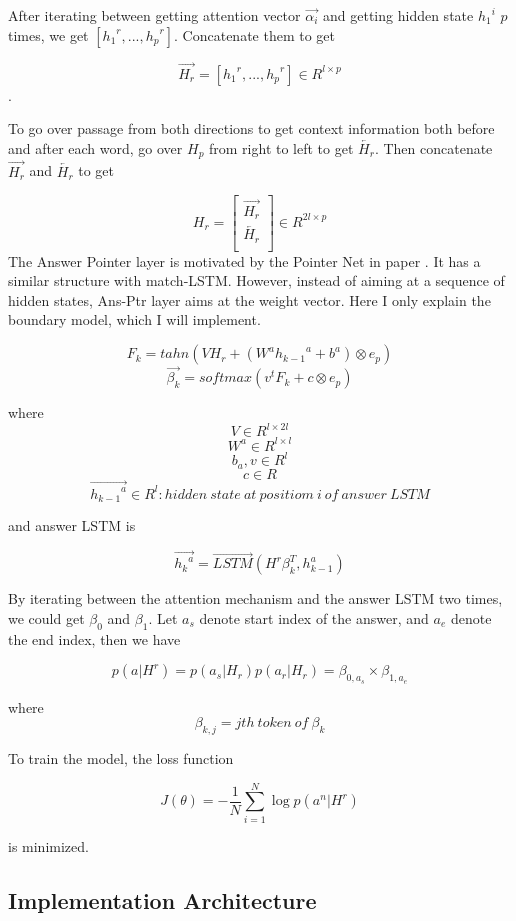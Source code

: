 \documentclass[12pt]{article}
\begin{document}
After iterating between getting attention vector $\overrightarrow{\alpha _i}$ and getting hidden state ${{h_{1}}^i}$ $p$ times, we get $[{{h_{1}}^r}, ..., {{h_{p}}^r}]$. Concatenate them to get

$$\overrightarrow{H_r} = [{{h_{1}}^r}, ..., {{h_{p}}^r}] \in R^{l \times p}$$.

To go over passage from both directions to get context information both before and after each word, go over $H_p$ from right to left to get $\overleftarrow{H_r}$. Then concatenate $\overrightarrow{H_r}$ and $\overleftarrow{H_r}$ to get

\[ H_r =
\begin{bmatrix}
\overrightarrow{H_r} \\
\overleftarrow{H_r} \\
\end{bmatrix}
\in R^{2l \times p}
\]
The Answer Pointer layer is motivated by the Pointer Net in paper \cite{vinyals2015pointer}. It has a similar structure with match-LSTM. However, instead of aiming at a sequence of hidden states, Ans-Ptr layer aims at the weight vector. Here I only explain the boundary model, which I will implement.

$$F_k = tahn(VH_r + (W^a{h_{k-1}}^a +  b^a) \otimes e_p)$$
$$\overrightarrow{\beta _k} = softmax(v^tF_k + c \otimes e_p)$$


where
$$V \in R^{l \times 2l}$$
$$W^a\in R^{l \times l} $$
$$b_a, v\in R^{l}  $$
$$c \in R $$
$$\overrightarrow{{h_{k-1}}^a}\in R^{l}: hidden\ state\ at\ positiom\ i\ of\ answer\ LSTM  $$

and answer LSTM is


$$\overrightarrow{{h_k}^a} = \overrightarrow{LSTM}(H^r\beta _k^T, h_{k-1}^a)$$

By iterating between the attention mechanism and the answer LSTM two times, we could get $\beta _0$ and $\beta _1$. Let $a_s$ denote start index of the answer, and $a_e$ denote the end index, then we have

$$p(a|H^r) = p(a_s|H_r)p(a_r|H_r)=\beta _{0, a_s} \times \beta_{1, a_e}$$

where $$\beta_{k, j} = jth\ token\ of\ \beta _k$$

To train the model, the loss function

$$J(\theta) = -\frac{1}{N}\sum_{i=1}^{N} \log{p(a^n|H^r)} $$

is minimized.


\subsection{Implementation Architecture}\label{sec:architectures}
\end{document}
